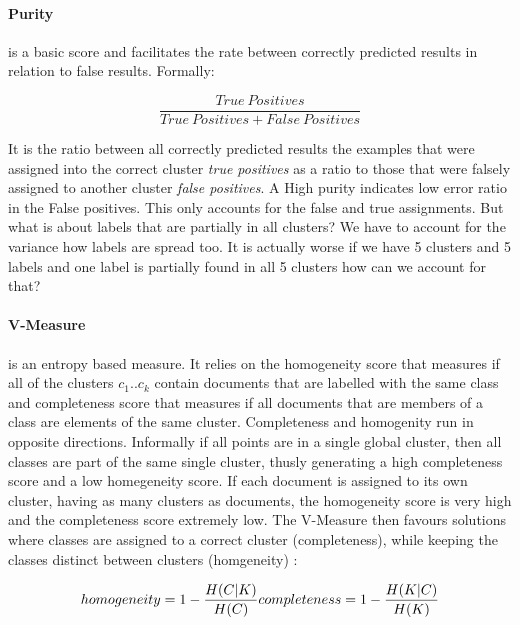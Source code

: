     \paragraph{Purity} is a basic score and facilitates the rate between correctly predicted results in relation to false results. Formally:

      \begin{equation}
        \frac{True\:Positives}{True\:Positives + False\:Positives}
      \end{equation}

    It is the ratio between all correctly predicted results the examples that were assigned into the correct cluster \emph{true positives} as a ratio to those that were falsely assigned to another cluster \emph{false positives}. A High purity indicates low error ratio in the False positives. This only accounts for the false and true assignments. But what is about labels that are partially in all clusters? We have to account for the variance how labels are spread too. It is actually worse if we have 5 clusters and 5 labels and one label is partially found in all 5 clusters how can we account for that?

    \paragraph{V-Measure} is an entropy based measure. It relies on the homogeneity score that measures if all of the clusters $c_1..c_k$ contain documents that are labelled with the same class and completeness score that measures if all documents that are members of a class are elements of the same cluster. Completeness and homogenity run in opposite directions. Informally if all points are in a single global cluster, then all classes are part of the same single cluster, thusly generating a high completeness score and a low homegeneity score. If each document is assigned to its own cluster, having as many clusters as documents, the homogeneity score is very high and the completeness score extremely low. The V-Measure then favours solutions where classes are assigned to a correct cluster (completeness), while keeping the classes distinct between clusters (homgeneity) \cite{VMeasure2007}:
      
      \begin{equation}
        homogeneity = 1 - \frac{H(C|K)}{H(C)}\\
        completeness = 1 - \frac{H(K|C)}{H(K)}
      \end{equation}


